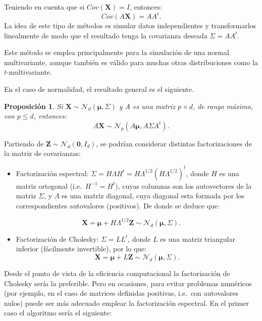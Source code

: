 \documentclass[
]{book}
\providecommand{\tightlist}{%
  \setlength{\itemsep}{0pt}\setlength{\parskip}{0pt}}
\theoremstyle{break}
\newtheorem{proposition}{Proposición}[chapter]
\theoremstyle{nonumberplain}
\begin{document}
Teniendo en cuenta que si \(Cov(\mathbf{X})= I\), entonces:
\[Cov(A\mathbf{X}) = AA^t.\]
La idea de este tipo de métodos es simular datos independientes y transformarlos linealmente de modo que el resultado tenga la covarianza deseada \(\Sigma = AA^t\).

Este método se emplea principalmente para la simulación de una
normal multivariante, aunque también es válido para muchas otras
distribuciones como la \(t\)-multivariante.

En el caso de normalidad, el resultado general es el siguiente.

\begin{proposition}
Si \(\mathbf{X} \sim \mathcal{N}_d\left( \boldsymbol\mu,\Sigma \right)\) y \(A\) es una matriz \(p\times d\), de
rango máximo, con \(p\leq d\), entonces:
\[A\mathbf{X} \sim \mathcal{N}_{p}\left(A\boldsymbol\mu,A\Sigma A^t\right).\]
\end{proposition}

Partiendo de \(\mathbf{Z} \sim \mathcal{N}_d\left( \mathbf{0},I_d\right)\), se podrían considerar distintas factorizaciones de la matriz de covarianzas:

\begin{itemize}
\tightlist
\item
  Factorización espectral:
  \(\Sigma=H\Lambda H^t =H\Lambda^{1/2}(H\Lambda^{1/2})^t\),
  donde \(H\) es una matriz ortogonal (i.e.~\(H^{-1}=H^{t}\)), cuyas columnas son los autovectores de la matriz \(\Sigma\), y \(\Lambda\) es una matriz diagonal, cuya diagonal esta formada por los correspondientes autovalores (positivos). De donde se deduce que:
\end{itemize}

\[\mathbf{X} =\boldsymbol\mu + H\Lambda^{1/2}\mathbf{Z} \sim \mathcal{N}_d\left( \boldsymbol\mu,\Sigma \right).\]

\begin{itemize}
\tightlist
\item
  Factorización de Cholesky: \(\Sigma=LL^t\), donde \(L\) es una matriz triangular inferior (fácilmente invertible), por lo que:
  \[\mathbf{X} =\boldsymbol\mu + L\mathbf{Z} 
  \sim \mathcal{N}_d\left( \boldsymbol\mu,\Sigma \right).\]
\end{itemize}

Desde el punto de vista de la eficiencia computacional la factorización de Cholesky sería la preferible. Pero en ocasiones, para evitar problemas numéricos (por ejemplo, en el caso de matrices definidas positivas, i.e.~con autovalores nulos) puede ser más adecuado emplear la factorización espectral.
En el primer caso el algoritmo sería el siguiente:
\end{document}
